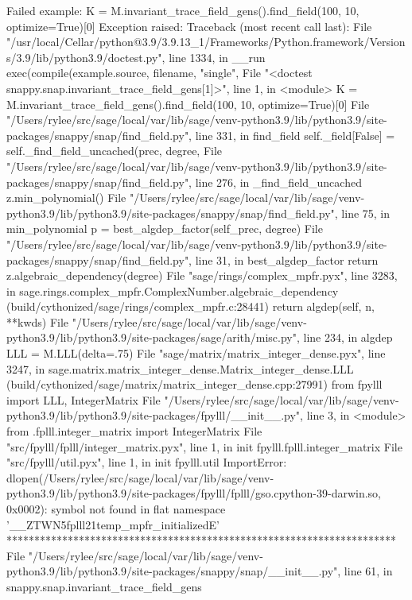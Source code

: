 Failed example:
    K = M.invariant_trace_field_gens().find_field(100, 10, optimize=True)[0]
Exception raised:
    Traceback (most recent call last):
      File "/usr/local/Cellar/python@3.9/3.9.13_1/Frameworks/Python.framework/Versions/3.9/lib/python3.9/doctest.py", line 1334, in __run
        exec(compile(example.source, filename, "single",
      File "<doctest snappy.snap.invariant_trace_field_gens[1]>", line 1, in <module>
        K = M.invariant_trace_field_gens().find_field(100, 10, optimize=True)[0]
      File "/Users/rylee/src/sage/local/var/lib/sage/venv-python3.9/lib/python3.9/site-packages/snappy/snap/find_field.py", line 331, in find_field
        self._field[False] = self._find_field_uncached(prec, degree,
      File "/Users/rylee/src/sage/local/var/lib/sage/venv-python3.9/lib/python3.9/site-packages/snappy/snap/find_field.py", line 276, in _find_field_uncached
        z.min_polynomial()
      File "/Users/rylee/src/sage/local/var/lib/sage/venv-python3.9/lib/python3.9/site-packages/snappy/snap/find_field.py", line 75, in min_polynomial
        p = best_algdep_factor(self_prec, degree)
      File "/Users/rylee/src/sage/local/var/lib/sage/venv-python3.9/lib/python3.9/site-packages/snappy/snap/find_field.py", line 31, in best_algdep_factor
        return z.algebraic_dependency(degree)
      File "sage/rings/complex_mpfr.pyx", line 3283, in sage.rings.complex_mpfr.ComplexNumber.algebraic_dependency (build/cythonized/sage/rings/complex_mpfr.c:28441)
        return algdep(self, n, **kwds)
      File "/Users/rylee/src/sage/local/var/lib/sage/venv-python3.9/lib/python3.9/site-packages/sage/arith/misc.py", line 234, in algdep
        LLL = M.LLL(delta=.75)
      File "sage/matrix/matrix_integer_dense.pyx", line 3247, in sage.matrix.matrix_integer_dense.Matrix_integer_dense.LLL (build/cythonized/sage/matrix/matrix_integer_dense.cpp:27991)
        from fpylll import LLL, IntegerMatrix
      File "/Users/rylee/src/sage/local/var/lib/sage/venv-python3.9/lib/python3.9/site-packages/fpylll/__init__.py", line 3, in <module>
        from .fplll.integer_matrix import IntegerMatrix
      File "src/fpylll/fplll/integer_matrix.pyx", line 1, in init fpylll.fplll.integer_matrix
      File "src/fpylll/util.pyx", line 1, in init fpylll.util
    ImportError: dlopen(/Users/rylee/src/sage/local/var/lib/sage/venv-python3.9/lib/python3.9/site-packages/fpylll/fplll/gso.cpython-39-darwin.so, 0x0002): symbol not found in flat namespace '__ZTWN5fplll21temp_mpfr_initializedE'
**********************************************************************
File "/Users/rylee/src/sage/local/var/lib/sage/venv-python3.9/lib/python3.9/site-packages/snappy/snap/__init__.py", line 61, in snappy.snap.invariant_trace_field_gens

